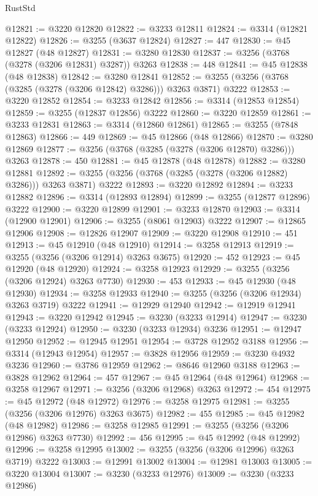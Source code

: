 \begin{lexlean}{RustStd}
\begin{coremodule}
{\begin{coremodule}
{{{{{{{{{{{{{{{{{{{{{{{{{{{{{{{{{{{{{@12821 := @3220 @12820
@12822 := @3233 @12811
@12824 := @3314 (@12821 @12822)
@12826 := @3255 (@3637 @12824)
@12827 := 447
@12830 := @45 @12827 (@48 @12827)
@12831 := @3280 @12830
@12837 := @3256 (@3768 (@3278 (@3206 @12831) @3287)) @3263
@12838 := 448
@12841 := @45 @12838 (@48 @12838)
@12842 := @3280 @12841
@12852 := @3255 (@3256 (@3768 (@3285 (@3278 (@3206 @12842) @3286))) @3263 @3871) @3222
@12853 := @3220 @12852
@12854 := @3233 @12842
@12856 := @3314 (@12853 @12854)
@12859 := @3255 (@12837 @12856) @3222
@12860 := @3220 @12859
@12861 := @3233 @12831
@12863 := @3314 (@12860 @12861)
@12865 := @3255 (@7848 @12863)
@12866 := 449
@12869 := @45 @12866 (@48 @12866)
@12870 := @3280 @12869
@12877 := @3256 (@3768 (@3285 (@3278 (@3206 @12870) @3286))) @3263
@12878 := 450
@12881 := @45 @12878 (@48 @12878)
@12882 := @3280 @12881
@12892 := @3255 (@3256 (@3768 (@3285 (@3278 (@3206 @12882) @3286))) @3263 @3871) @3222
@12893 := @3220 @12892
@12894 := @3233 @12882
@12896 := @3314 (@12893 @12894)
@12899 := @3255 (@12877 @12896) @3222
@12900 := @3220 @12899
@12901 := @3233 @12870
@12903 := @3314 (@12900 @12901)
@12906 := @3255 (@8061 @12903) @3222
@12907 := @12865 @12906
@12908 := @12826 @12907
@12909 := @3220 @12908
@12910 := 451
@12913 := @45 @12910 (@48 @12910)
@12914 := @3258 @12913
@12919 := @3255 (@3256 (@3206 @12914) @3263 @3675)
@12920 := 452
@12923 := @45 @12920 (@48 @12920)
@12924 := @3258 @12923
@12929 := @3255 (@3256 (@3206 @12924) @3263 @7730)
@12930 := 453
@12933 := @45 @12930 (@48 @12930)
@12934 := @3258 @12933
@12940 := @3255 (@3256 (@3206 @12934) @3263 @3719) @3222
@12941 := @12929 @12940
@12942 := @12919 @12941
@12943 := @3220 @12942
@12945 := @3230 (@3233 @12914)
@12947 := @3230 (@3233 @12924)
@12950 := @3230 (@3233 @12934) @3236
@12951 := @12947 @12950
@12952 := @12945 @12951
@12954 := @3728 @12952 @3188
@12956 := @3314 (@12943 @12954)
@12957 := @3828 @12956
@12959 := @3230 @4932 @3236
@12960 := @3786 @12959
@12962 := @8646 @12960 @3188
@12963 := @3828 @12962
@12964 := 457
@12967 := @45 @12964 (@48 @12964)
@12968 := @3258 @12967
@12971 := @3256 (@3206 @12968) @3263
@12972 := 454
@12975 := @45 @12972 (@48 @12972)
@12976 := @3258 @12975
@12981 := @3255 (@3256 (@3206 @12976) @3263 @3675)
@12982 := 455
@12985 := @45 @12982 (@48 @12982)
@12986 := @3258 @12985
@12991 := @3255 (@3256 (@3206 @12986) @3263 @7730)
@12992 := 456
@12995 := @45 @12992 (@48 @12992)
@12996 := @3258 @12995
@13002 := @3255 (@3256 (@3206 @12996) @3263 @3719) @3222
@13003 := @12991 @13002
@13004 := @12981 @13003
@13005 := @3220 @13004
@13007 := @3230 (@3233 @12976)
@13009 := @3230 (@3233 @12986)
}}}}}}}}}}}}}}}}}}}}}}}}}}}}}}}}}}}}}
\end{coremodule}}
\end{coremodule}
\end{lexlean}
